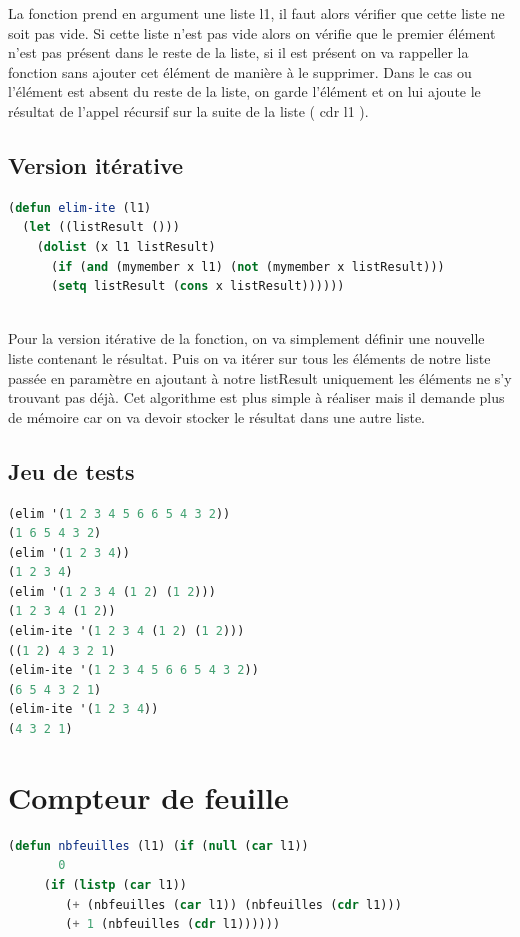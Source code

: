 \documentclass[a4paper,10pt]{report}
\begin{document}
      La fonction prend en argument une liste l1, il faut alors vérifier que cette liste ne soit pas vide. Si cette liste n'est pas vide alors on vérifie que le premier élément
      n'est pas présent dans le reste de la liste, si il est présent on va rappeller la fonction sans ajouter cet élément de manière à le supprimer. Dans le cas ou l'élément
      est absent du reste de la liste, on garde l'élément et on lui ajoute le résultat de l'appel récursif sur la suite de la liste ( cdr l1 ).
      

      \subsection{Version itérative}
	\begin{lstlisting}[language=Lisp]
(defun elim-ite (l1)
  (let ((listResult ()))
    (dolist (x l1 listResult)
      (if (and (mymember x l1) (not (mymember x listResult)))
	  (setq listResult (cons x listResult))))))
	
	\end{lstlisting}

	Pour la version itérative de la fonction, on va simplement définir une nouvelle liste contenant le résultat. Puis on va itérer sur tous les éléments de notre liste passée en 
	paramètre en ajoutant à notre listResult uniquement les éléments ne s'y trouvant pas déjà.\newline
	Cet algorithme est plus simple à réaliser mais il demande plus de mémoire car on va devoir stocker le résultat dans une autre liste.
	   \subsection{Jeu de tests}
	  \begin{lstlisting}[language=Lisp]
(elim '(1 2 3 4 5 6 6 5 4 3 2))
(1 6 5 4 3 2)
(elim '(1 2 3 4))
(1 2 3 4)
(elim '(1 2 3 4 (1 2) (1 2)))
(1 2 3 4 (1 2))
(elim-ite '(1 2 3 4 (1 2) (1 2)))
((1 2) 4 3 2 1)
(elim-ite '(1 2 3 4 5 6 6 5 4 3 2))
(6 5 4 3 2 1)
(elim-ite '(1 2 3 4))
(4 3 2 1)

		 \end{lstlisting}
		 \newpage
	\section{Compteur de feuille}
	
	   \begin{lstlisting}[language=Lisp]
(defun nbfeuilles (l1) (if (null (car l1))
	   0
	 (if (listp (car l1)) 
	    (+ (nbfeuilles (car l1)) (nbfeuilles (cdr l1))) 
	    (+ 1 (nbfeuilles (cdr l1))))))
	  \end{lstlisting}
\end{document}
